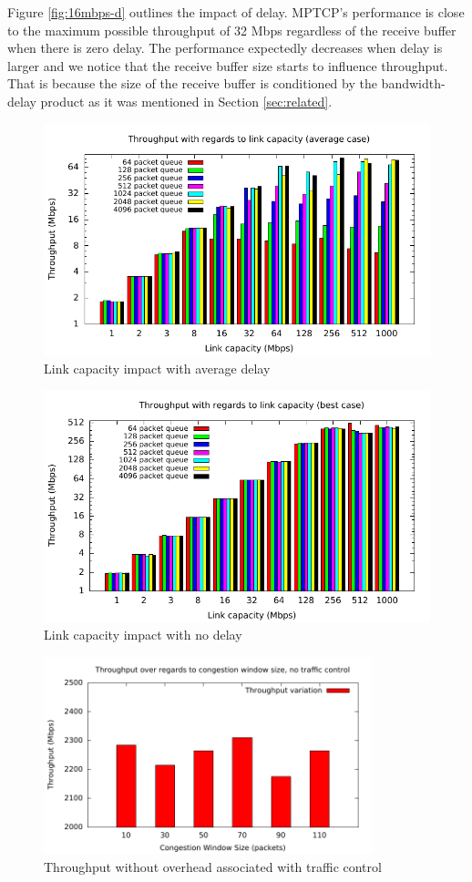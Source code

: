 Figure \ref{fig:16mbps-d} outlines the impact of delay. MPTCP's performance is
close to the maximum possible throughput of 32 Mbps regardless of the receive
buffer when there is zero delay. The performance expectedly decreases when delay
is larger and we notice that the receive buffer size starts to influence
throughput. That is because the size of the receive buffer is conditioned by the
bandwidth-delay product as it was mentioned in Section \ref{sec:related}.

\begin{figure}
  \centering
  \includegraphics[width=\textwidth]{img/throughput-bdw-avg}
  \caption{Link capacity impact with average delay}
  \label{fig:bdw-avg}
\end{figure}

\begin{figure}
  \centering
  \includegraphics[width=\textwidth]{img/throughput-bdw-max}
  \caption{Link capacity impact with no delay}
  \label{fig:bdw-max}
\end{figure}

\begin{figure}
  \centering
  \includegraphics[width=0.85\textwidth]{img/throughput-cwnd-notc}
  \caption{Throughput without overhead associated with traffic control}
  \label{fig:cwnd-notc}
\end{figure}

